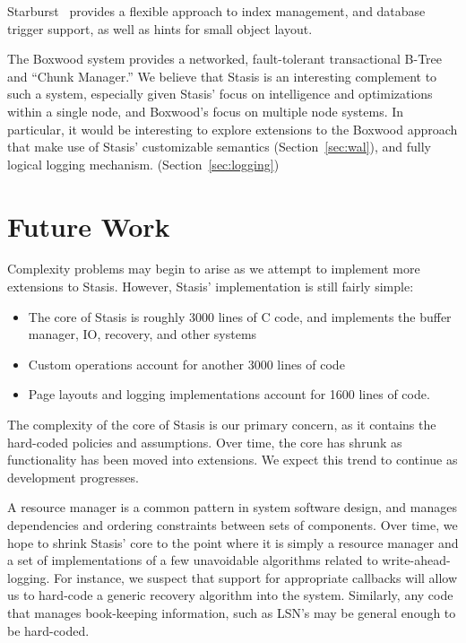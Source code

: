 \documentclass[letterpaper,twocolumn,10pt]{article}
\newcommand{\yad}{Stasis\xspace}
\newcommand{\yads}{Stasis'\xspace}
\begin{document}
Starburst~\cite{starburst} provides a flexible approach to index
management, and database trigger support, as well as hints for small
object layout.

The Boxwood system provides a networked, fault-tolerant transactional
B-Tree and ``Chunk Manager.''  We believe that \yad is an interesting
complement to such a system, especially given \yads focus on
intelligence and optimizations within a single node, and Boxwood's
focus on multiple node systems.  In particular, it would be
interesting to explore extensions to the Boxwood approach that make
use of \yads customizable semantics (Section~\ref{sec:wal}), and fully logical logging
mechanism. (Section~\ref{sec:logging})

\section{Future Work}

Complexity problems may begin to arise as we attempt to implement more
extensions to \yad.  However, \yads implementation is still fairly simple:

\begin{itemize}
\item The core of \yad is roughly 3000 lines
of C code, and implements the buffer manager, IO, recovery, and other
systems
\item Custom operations account for another 3000 lines of code
\item Page layouts and logging implementations account for 1600 lines of code.
\end{itemize}

The complexity of the core of \yad is our primary concern, as it
contains the hard-coded policies and assumptions.  Over time, the core has
shrunk as functionality has been moved into extensions.  We expect
this trend to continue as development progresses.  

A resource manager
is a common pattern in system software design, and manages
dependencies and ordering constraints between sets of components.
Over time, we hope to shrink \yads core to the point where it is
simply a resource manager and a set of implementations of a few unavoidable
algorithms related to write-ahead-logging.  For instance, 
we suspect that support for appropriate callbacks will 
allow us to hard-code a generic recovery algorithm into the 
system.  Similarly, any code that manages book-keeping information, such as 
LSN's may be general enough to be hard-coded.  
\end{document}
